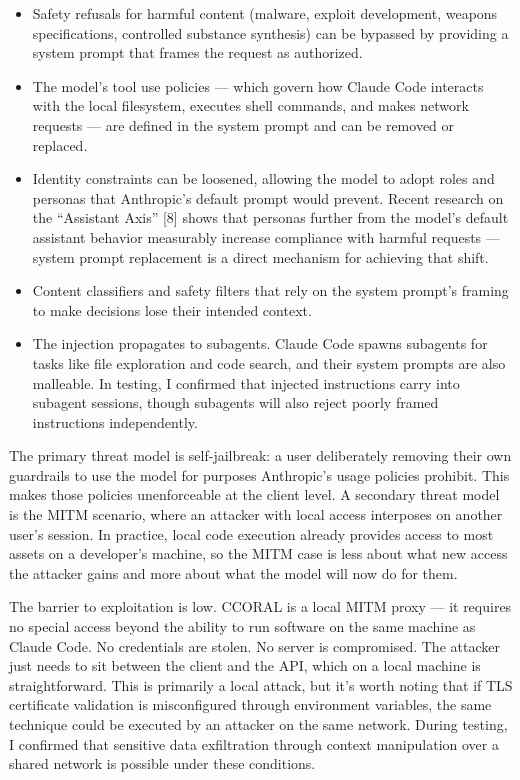 \documentclass[11pt,a4paper]{article}
\begin{document}
\begin{itemize}[nosep]
    \item Safety refusals for harmful content (malware, exploit development, weapons specifications, controlled substance synthesis) can be bypassed by providing a system prompt that frames the request as authorized.
    \item The model's tool use policies --- which govern how Claude Code interacts with the local filesystem, executes shell commands, and makes network requests --- are defined in the system prompt and can be removed or replaced.
    \item Identity constraints can be loosened, allowing the model to adopt roles and personas that Anthropic's default prompt would prevent. Recent research on the ``Assistant Axis'' [8] shows that personas further from the model's default assistant behavior measurably increase compliance with harmful requests --- system prompt replacement is a direct mechanism for achieving that shift.
    \item Content classifiers and safety filters that rely on the system prompt's framing to make decisions lose their intended context.
    \item The injection propagates to subagents. Claude Code spawns subagents for tasks like file exploration and code search, and their system prompts are also malleable. In testing, I confirmed that injected instructions carry into subagent sessions, though subagents will also reject poorly framed instructions independently.
\end{itemize}

The primary threat model is self-jailbreak: a user deliberately removing their own guardrails to use the model for purposes Anthropic's usage policies prohibit. This makes those policies unenforceable at the client level. A secondary threat model is the MITM scenario, where an attacker with local access interposes on another user's session. In practice, local code execution already provides access to most assets on a developer's machine, so the MITM case is less about what new access the attacker gains and more about what the model will now do for them.

The barrier to exploitation is low. CCORAL is a local MITM proxy --- it requires no special access beyond the ability to run software on the same machine as Claude Code. No credentials are stolen. No server is compromised. The attacker just needs to sit between the client and the API, which on a local machine is straightforward. This is primarily a local attack, but it's worth noting that if TLS certificate validation is misconfigured through environment variables, the same technique could be executed by an attacker on the same network. During testing, I confirmed that sensitive data exfiltration through context manipulation over a shared network is possible under these conditions.
\end{document}
